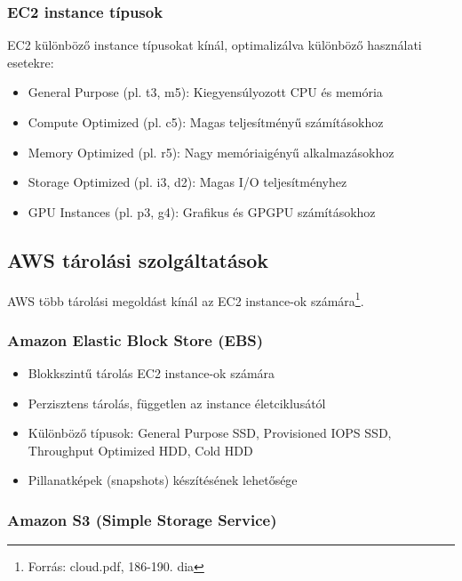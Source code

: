 \documentclass[a4paper,12pt]{article}
\begin{document}
    \subsubsection{EC2 instance típusok}

    EC2 különböző instance típusokat kínál, optimalizálva különböző használati esetekre:

    \begin{itemize}
        \item General Purpose (pl. t3, m5): Kiegyensúlyozott CPU és memória
        \item Compute Optimized (pl. c5): Magas teljesítményű számításokhoz
        \item Memory Optimized (pl. r5): Nagy memóriaigényű alkalmazásokhoz
        \item Storage Optimized (pl. i3, d2): Magas I/O teljesítményhez
        \item GPU Instances (pl. p3, g4): Grafikus és GPGPU számításokhoz
    \end{itemize}

    \subsection{AWS tárolási szolgáltatások}

    AWS több tárolási megoldást kínál az EC2 instance-ok számára\footnote{Forrás: cloud.pdf, 186-190. dia}.

    \subsubsection{Amazon Elastic Block Store (EBS)}

    \begin{itemize}
        \item Blokkszintű tárolás EC2 instance-ok számára
        \item Perzisztens tárolás, független az instance életciklusától
        \item Különböző típusok: General Purpose SSD, Provisioned IOPS SSD, Throughput Optimized HDD, Cold HDD
        \item Pillanatképek (snapshots) készítésének lehetősége
    \end{itemize}

    \subsubsection{Amazon S3 (Simple Storage Service)}
\end{document}
